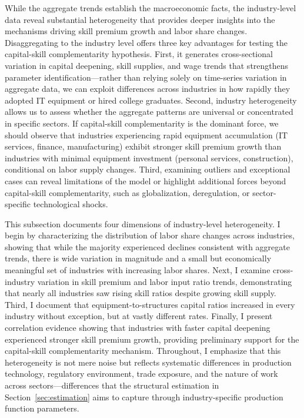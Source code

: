 \documentclass[12pt]{article}
\begin{document}
While the aggregate trends establish the macroeconomic facts, the industry-level data reveal substantial heterogeneity that provides deeper insights into the mechanisms driving skill premium growth and labor share changes. Disaggregating to the industry level offers three key advantages for testing the capital-skill complementarity hypothesis. First, it generates cross-sectional variation in capital deepening, skill supplies, and wage trends that strengthens parameter identification---rather than relying solely on time-series variation in aggregate data, we can exploit differences across industries in how rapidly they adopted IT equipment or hired college graduates. Second, industry heterogeneity allows us to assess whether the aggregate patterns are universal or concentrated in specific sectors. If capital-skill complementarity is the dominant force, we should observe that industries experiencing rapid equipment accumulation (IT services, finance, manufacturing) exhibit stronger skill premium growth than industries with minimal equipment investment (personal services, construction), conditional on labor supply changes. Third, examining outliers and exceptional cases can reveal limitations of the model or highlight additional forces beyond capital-skill complementarity, such as globalization, deregulation, or sector-specific technological shocks.

This subsection documents four dimensions of industry-level heterogeneity. I begin by characterizing the distribution of labor share changes across industries, showing that while the majority experienced declines consistent with aggregate trends, there is wide variation in magnitude and a small but economically meaningful set of industries with increasing labor shares. Next, I examine cross-industry variation in skill premium and labor input ratio trends, demonstrating that nearly all industries saw rising skill ratios despite growing skill supply. Third, I document that equipment-to-structures capital ratios increased in every industry without exception, but at vastly different rates. Finally, I present correlation evidence showing that industries with faster capital deepening experienced stronger skill premium growth, providing preliminary support for the capital-skill complementarity mechanism. Throughout, I emphasize that this heterogeneity is not mere noise but reflects systematic differences in production technology, regulatory environment, trade exposure, and the nature of work across sectors---differences that the structural estimation in Section~\ref{sec:estimation} aims to capture through industry-specific production function parameters.
\end{document}
